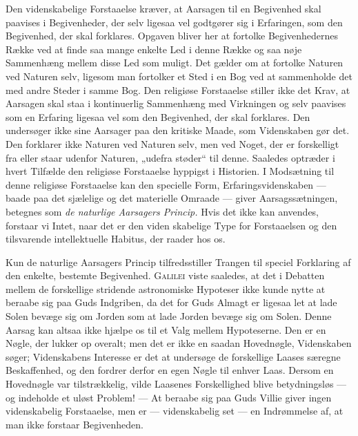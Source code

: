 \documentclass[12pt,a4paper,openany]{book}
\newcommand{\opage}[1]{\marginnote{\footnotesize\textit{[#1]}}}
\begin{document}
Den videnskabelige Forstaaelse kræver, at Aarsagen til en Begivenhed
skal paavises i Begivenheder, der selv ligesaa vel godtgører sig i
Erfaringen, som den Begivenhed, der skal forklares. Opgaven bliver her
at fortolke Begivenhedernes Række ved at finde saa mange enkelte Led i
denne Række og saa nøje Sammenhæng mellem disse Led som muligt. Det
gælder om at fortolke Naturen ved Naturen selv, ligesom man fortolker et
Sted i en Bog ved at sammenholde det med andre Steder i samme Bog. Den
religiøse Forstaaelse stiller ikke det Krav, at Aarsagen skal staa i
kontinuerlig Sammenhæng med Virkningen og selv paavises som en Erfaring
ligesaa vel som den Begivenhed, der skal forklares. Den undersøger ikke
sine Aarsager paa den kritiske Maade, som Videnskaben gør det. Den
forklarer ikke Naturen ved Naturen selv, men ved Noget, der er
forskelligt fra eller staar udenfor Naturen, „udefra støder“ til denne.
Saaledes optræder i hvert Tilfælde den religiøse Forstaaelse hyppigst i
Historien. I Modsætning til denne religiøse Forstaaelse kan den
specielle Form, Erfaringsvidenskaben --- baade paa det sjælelige og det
materielle Omraade --- giver Aarsagssætningen, betegnes som \textit{de
naturlige Aarsagers Princip.} Hvis det ikke kan anvendes, forstaar vi
Intet, naar det er den viden%
\opage{19}skabelige Type for Forstaaelsen og den tilsvarende
intellektuelle Habitus, der raader hos os.

Kun de naturlige Aarsagers Princip tilfredsstiller Trangen til speciel
Forklaring af den enkelte, bestemte Begivenhed. \textsc{Galilei} viste
saaledes, at det i Debatten mellem de forskellige stridende astronomiske
Hypoteser ikke kunde nytte at beraabe sig paa Guds Indgriben, da det for
Guds Almagt er ligesaa let at lade Solen bevæge sig om Jorden som at
lade Jorden bevæge sig om Solen. Denne Aarsag kan altsaa ikke hjælpe os
til et Valg mellem Hypoteserne. Den er en Nøgle, der lukker op overalt;
men det er ikke en saadan Hovednøgle, Videnskaben søger; Videnskabens
Interesse er det at undersøge de forskellige Laases særegne
Beskaffenhed, og den fordrer derfor en egen Nøgle til enhver Laas.
Dersom en Hovednøgle var tilstrækkelig, vilde Laasenes Forskellighed
blive betydningsløs --- og indeholde et uløst Problem! --- At beraabe
sig paa Guds Villie giver ingen videnskabelig Forstaaelse, men er ---
videnskabelig set --- en Indrømmelse af, at man ikke forstaar
Begivenheden.
\end{document}
